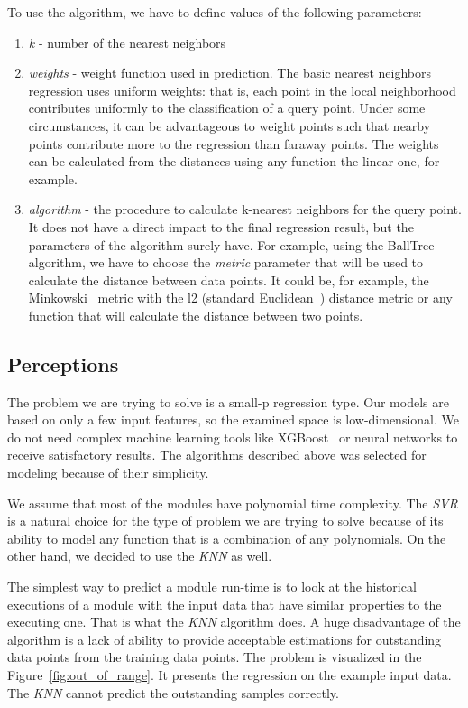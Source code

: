 To use the algorithm, we have to define values of the following parameters:
\begin{enumerate}
	\item \textit{k} - number of the nearest neighbors
	\item \textit{weights} - weight function used in prediction. The basic nearest neighbors regression uses uniform weights: that is, each point in the local neighborhood contributes uniformly to the classification of a query point. Under some circumstances, it can be advantageous to weight points such that nearby points contribute more to the regression than faraway points. The weights can be calculated from the distances using any function the linear one, for example.
	\item \textit{algorithm} - the procedure to calculate k-nearest neighbors for the query point. It does not have a direct impact to the final regression result, but the parameters of the algorithm surely have. For example, using the BallTree algorithm, we have to choose the \textit{metric} parameter that will be used to calculate the distance between data points. It could be, for example, the Minkowski~\cite{minkowski} metric with the l2 (standard Euclidean~\cite{euclidean}) distance metric or any function that will calculate the distance between two points.
\end{enumerate}

\subsection{Perceptions}

 The problem we are trying to solve is a small-p regression type. Our models are based on only a few input features, so the examined space is low-dimensional. We do not need complex machine learning tools like XGBoost~\cite{xgb} or neural networks to receive satisfactory results. The algorithms described above was selected for modeling because of their simplicity. 
 
 We assume that most of the modules have polynomial time complexity. The \textit{SVR} is a natural choice for the type of problem we are trying to solve because of its ability to model any function that is a combination of any polynomials. On the other hand, we decided to use the \textit{KNN} as well. 
 
 The simplest way to predict a module run-time is to look at the historical executions of a module with the input data that have similar properties to the executing one. That is what the \textit{KNN} algorithm does. A huge disadvantage of the algorithm is a lack of ability to provide acceptable estimations for outstanding data points from the training data points. The problem is visualized in the Figure~\ref{fig:out_of_range}. It presents the regression on the example input data. The \textit{KNN} cannot predict the outstanding samples correctly.
 